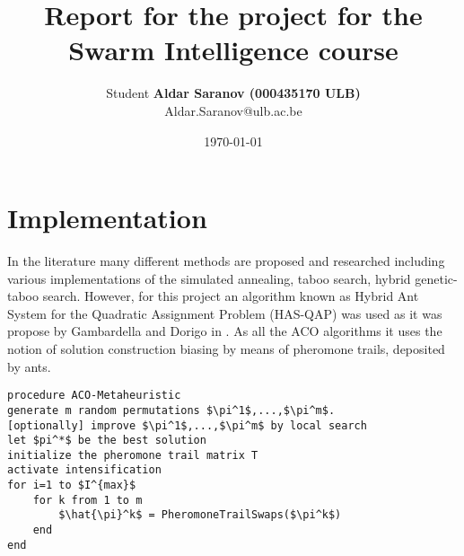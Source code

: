 \documentclass[12pt]{article}
\author{Student \textbf{Aldar Saranov (000435170 ULB)} \\ Aldar.Saranov@ulb.ac.be}
\date{\today}
\title{Report for the project for the Swarm Intelligence course}
\begin{document}
\maketitle
\newpage

\section{Implementation}

In the literature many different methods are proposed and researched including various implementations of the simulated annealing, taboo search, hybrid genetic-taboo search. However, for this project an algorithm known as Hybrid Ant System for the Quadratic Assignment Problem (HAS-QAP) was used as it was propose by Gambardella and Dorigo in \cite{Gambardella}. As all the ACO algorithms it uses the notion of solution construction biasing by means of pheromone trails, deposited by ants.

\begin{minipage}[c]{0.95\textwidth}
\begin{lstlisting}[caption={General ACO pseudo-code}, label={lst:aco},mathescape]
procedure ACO-Metaheuristic
generate m random permutations $\pi^1$,...,$\pi^m$.
[optionally] improve $\pi^1$,...,$\pi^m$ by local search
let $pi^*$ be the best solution
initialize the pheromone trail matrix T
activate intensification
for i=1 to $I^{max}$
	for k from 1 to m
		$\hat{\pi}^k$ = PheromoneTrailSwaps($\pi^k$)
	end
end
\end{lstlisting}
\end{minipage}




\end{document}
